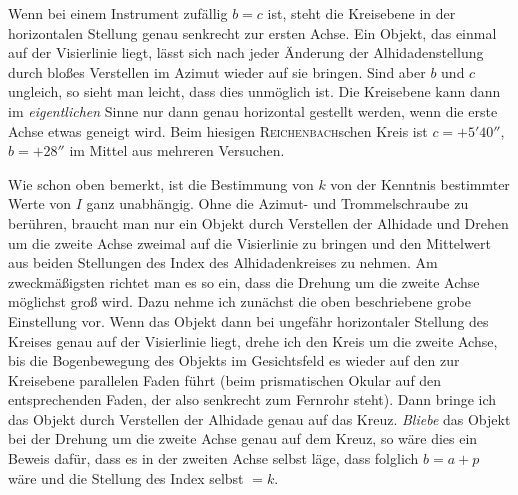 \par\indent Wenn bei einem Instrument zufällig $b=c$ ist, steht die Kreisebene in der horizontalen Stellung genau senkrecht zur ersten Achse. Ein Objekt, das einmal auf der Visierlinie liegt, lässt sich nach jeder Änderung der Alhidadenstellung durch bloßes Verstellen im Azimut wieder auf sie bringen.  Sind aber $b$ und $c$ ungleich, so sieht man leicht, dass dies unmöglich ist. Die Kreisebene kann dann im \emph{eigentlichen} Sinne nur dann genau horizontal gestellt werden, wenn die erste Achse etwas geneigt wird. Beim hiesigen \textsc{Reichenbach}schen Kreis ist $c=+5'40''$, $b=+28''$ im Mittel aus mehreren Versuchen.

\par\indent Wie schon oben bemerkt, ist die Bestimmung von $k$ von der Kenntnis bestimmter Werte von $I$ ganz unabhängig. Ohne die Azimut- und Trommelschraube zu berühren, braucht man nur ein Objekt durch Verstellen der Alhidade und Drehen um die zweite Achse zweimal auf die Visierlinie zu bringen und den Mittelwert aus beiden Stellungen des Index des Alhidadenkreises zu nehmen. Am zweckmäßigsten richtet man es so ein, dass die Drehung um die zweite Achse möglichst groß wird. Dazu nehme ich zunächst die oben beschriebene grobe Einstellung vor. Wenn das Objekt dann bei ungefähr horizontaler Stellung des Kreises genau auf der Visierlinie liegt, drehe ich den Kreis um die zweite Achse, bis die Bogenbewegung des Objekts im Gesichtsfeld es wieder auf den zur Kreisebene parallelen Faden führt (beim prismatischen Okular auf den entsprechenden Faden, der also senkrecht zum Fernrohr steht). Dann bringe ich das Objekt durch Verstellen der Alhidade genau auf das Kreuz. \emph{Bliebe} das Objekt bei der Drehung um die zweite Achse genau auf dem Kreuz, so wäre dies ein Beweis dafür, dass es in der zweiten Achse selbst läge, dass folglich $b=a+p$ wäre und die Stellung des Index selbst $=k$.

